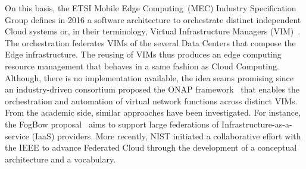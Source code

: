 


On this basis,
%
the ETSI Mobile Edge Computing~(MEC)
Industry Specification Group defines in 2016 a software architecture
to orchestrate distinct independent Cloud systems or, in their terminology, Virtual
Infrastructure Managers (VIM)~\cite{7574435}.
%
The orchestration federates VIMs of the several Data Centers that
compose the Edge infrastructure. The reusing of VIMs thus produces an
edge computing resource management that behaves in a same fashion as
Cloud Computing.
%
Although, there is no implementation available, the idea seams promising since an industry-driven consortium proposed
the ONAP framework~\cite{onap} that enables the orchestration and
automation of virtual network functions across distinct VIMs. From
the academic side, similar approaches have been investigated.
For instance, the FogBow proposal~\cite{brasileiro2016fogbow} aims to
support large federations of Infrastructure-as-a-service (IaaS)
providers. More recently, NIST %
initiated a collaborative effort with the IEEE
to advance Federated Cloud through the development
of a conceptual architecture and a vocabulary.
%

